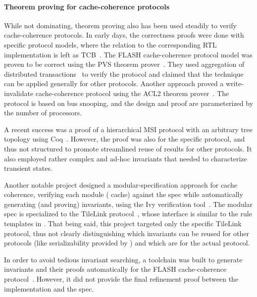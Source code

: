 \paragraph{Theorem proving for cache-coherence protocols}

While not dominating, theorem proving also has been used steadily to verify cache-coherence protocols.
In early days, the correctness proofs were done with specific protocol models, where the relation to the corresponding RTL implementation is left as TCB~\cite{Park:1996,Moore:1998}.
The FLASH cache-coherence protocol model was proven to be correct using the PVS theorem prover~\cite{Park:1996}.
They used aggregation of distributed transactions~\cite{thesis:Park:1996} to verify the protocol and claimed that the technique can be applied generally for other protocols.
Another approach proved a write-invalidate cache-coherence protocol using the ACL2 theorem prover~\cite{Moore:1998}.
The protocol is based on bus snooping, and the design and proof are parameterized by the number of processors.

A recent success was a proof of a hierarchical MSI protocol with an arbitrary tree topology using Coq~\cite{Murali:2015}.
However, the proof was also for the specific protocol, and thus not structured to promote streamlined reuse of results for other protocols.
It also employed rather complex and ad-hoc invariants that needed to characterize transient states.

Another notable project designed a modular-specification approach for cache coherence, verifying each module (\ie{} cache) against the spec while automatically generating (and proving) invariants, using the Ivy verification tool~\cite{ivy:Padon:2016, McMillan:2016, ivy:McMillan:2020}.
The modular spec is specialized to the TileLink protocol~\cite{tilelink}, whose interface is similar to the rule templates in \hemiola{}.
That being said, this project targeted only the specific TileLink protocol, thus not clearly distinguishing which invariants can be reused for other protocols (like serializability provided by \hemiola{}) and which are for the actual protocol.

In order to avoid tedious invariant searching, a toolchain was built to generate invariants and their proofs automatically for the FLASH cache-coherence protocol~\cite{Li:2018}.
However, it did not provide the final refinement proof between the implementation and the spec.
